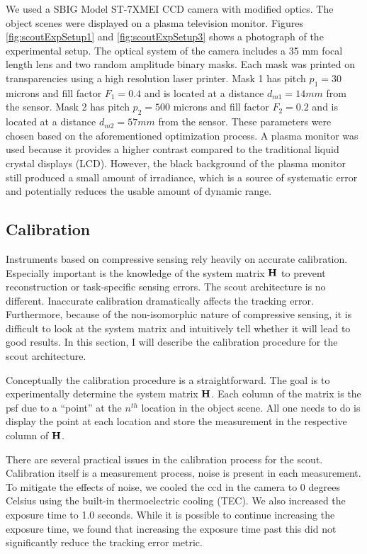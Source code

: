 We used a SBIG Model ST-7XMEI CCD camera with modified optics. The object scenes were displayed on a plasma television monitor. Figures \ref{fig:scoutExpSetup1} and \ref{fig:scoutExpSetup3} shows a photograph of the experimental setup. The optical system of the camera includes a 35 mm focal length lens and two random amplitude binary masks. Each mask was printed on transparencies using a high resolution laser printer. Mask 1 has pitch $p_1 = 30$ microns and fill factor $F_1 = 0.4$ and is located at a distance $d_{m1} = 14mm$ from the sensor. Mask 2 has pitch $p_2 = 500$ microns and fill factor $F_2 = 0.2$ and is located at a distance $d_{m2} = 57mm$ from the sensor. These parameters were chosen based on the aforementioned optimization process. A plasma monitor was used because it provides a higher contrast compared to the traditional liquid crystal displays (LCD). However, the black background of the plasma monitor still produced a small amount of irradiance, which is a source of systematic error and potentially reduces the usable amount of dynamic range. 
\subsection{Calibration}\label{ssec:ScoutCalibration}

Instruments based on compressive sensing rely heavily on accurate calibration. Especially important is the knowledge of the system matrix $\mathbf{H}$ to prevent reconstruction or task-specific sensing errors. The \gls{scout} architecture is no different. Inaccurate calibration dramatically affects the tracking error.  Furthermore, because of the non-isomorphic nature of compressive sensing, it is difficult to look at the system matrix and intuitively tell whether it will lead to good results. In this section, I will describe the calibration procedure for the \gls{scout} architecture. 

Conceptually the calibration procedure is a straightforward. The goal is to experimentally determine the system matrix $\mathbf{H}$. Each column of the matrix   is the \acrfull{psf} due to a ``point'' at the $n^{th}$ location in the object scene. All one needs to do is display the point at each location and store the measurement in the respective column of $\mathbf{H}$. 


There are several practical issues in the calibration process for the \gls{scout}. Calibration itself is a measurement process, noise is present in each measurement. To mitigate the effects of noise, we cooled the \gls{ccd} in the camera to $0$ degrees Celsius using the built-in thermoelectric cooling (TEC). We also increased the exposure time to 1.0 seconds. While it is possible to continue increasing the exposure time, we found that increasing the exposure time past this did not significantly reduce the tracking error metric.

